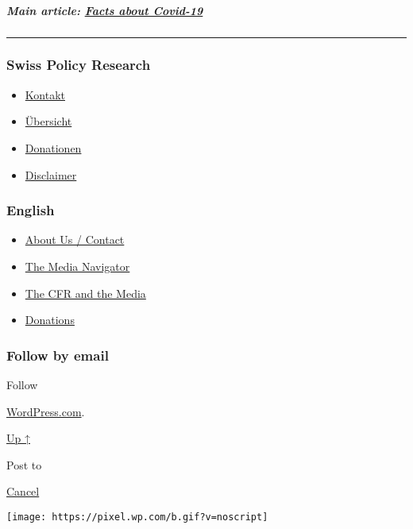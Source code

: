 \hypertarget{main-article-facts-about-covid-19}{%
\subparagraph{\texorpdfstring{\textbf{Main article}:
\href{https://swprs.org/a-swiss-doctor-on-covid-19/}{Facts about
Covid-19}}{Main article: Facts about Covid-19}}\label{main-article-facts-about-covid-19}}

\begin{center}\rule{0.5\linewidth}{\linethickness}\end{center}

\hypertarget{swiss-policy-research}{%
\subsubsection{Swiss Policy Research}\label{swiss-policy-research}}

\begin{itemize}
\tightlist
\item
  \href{https://swprs.org/kontakt/}{Kontakt}
\item
  \href{https://swprs.org/uebersicht/}{Übersicht}
\item
  \href{https://swprs.org/donationen/}{Donationen}
\item
  \href{https://swprs.org/disclaimer/}{Disclaimer}
\end{itemize}

\hypertarget{english}{%
\subsubsection{English}\label{english}}

\begin{itemize}
\tightlist
\item
  \href{https://swprs.org/contact/}{About Us / Contact}
\item
  \href{https://swprs.org/media-navigator/}{The Media Navigator}
\item
  \href{https://swprs.org/the-american-empire-and-its-media/}{The CFR
  and the Media}
\item
  \href{https://swprs.org/donations/}{Donations}
\end{itemize}

\hypertarget{follow-by-email}{%
\subsubsection{Follow by email}\label{follow-by-email}}

Follow

\href{https://wordpress.com/?ref=footer_custom_com}{WordPress.com}.

\protect\hyperlink{}{Up ↑}

Post to

\protect\hyperlink{}{Cancel}

\texttt{[image: https://pixel.wp.com/b.gif?v=noscript]}
